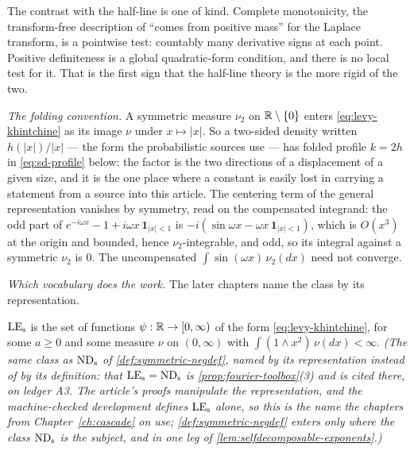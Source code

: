 \begin{remark}
The contrast with the half-line is one of kind. Complete monotonicity, the transform-free
description of ``comes from positive mass'' for the Laplace transform, is a pointwise test:
countably many derivative signs at each point. Positive definiteness is a global quadratic-form
condition, and there is no local test for it. That is the first sign that the half-line theory
is the more rigid of the two.
\end{remark}

\emph{The folding convention.} A symmetric \Levy{} measure $\nu_2$ on $\mathbb{R} \setminus \{0\}$
enters \ref{eq:levy-khintchine} as its image $\nu$ under $x \mapsto |x|$. So a two-sided
\Levy{} density written $h(|x|)/|x|$ --- the form the probabilistic sources use --- has folded
profile $k = 2h$ in \ref{eq:sd-profile} below: the factor is the two directions of a
displacement of a given size, and it is the one place where a constant is easily lost in
carrying a statement from a source into this article. The centering term of the general
representation vanishes by symmetry, read on the compensated integrand: the odd part of
$e^{-i\omega x} - 1 + i\omega x\,\mathbf 1_{|x| < 1}$ is
$-i(\sin\omega x - \omega x\,\mathbf 1_{|x|<1})$, which is $O(x^3)$ at the origin and bounded,
hence $\nu_2$-integrable, and odd, so its integral against a symmetric $\nu_2$ is $0$. The
uncompensated $\int \sin(\omega x)\,\nu_2(dx)$ need not converge.

\emph{Which vocabulary does the work.} The later chapters name the class by its representation.

\begin{definition}\label{def:levy-exponents}
\leanok
$\mathrm{LE}_{\mathrm{s}}$ is the set of functions $\psi : \mathbb{R} \to [0,\infty)$ of the form
\ref{eq:levy-khintchine}, for some $a \ge 0$ and some measure $\nu$ on $(0,\infty)$ with
$\int (1 \wedge x^2)\,\nu(dx) < \infty$.
\statusT\quad\emph{(The same class as $\mathrm{ND}_{\mathrm{s}}$ of \ref{def:symmetric-negdef}, named by its
representation instead of by its definition: that $\mathrm{LE}_{\mathrm{s}} = \mathrm{ND}_{\mathrm{s}}$ is \ref{prop:fourier-toolbox}(3)
and is cited there, on ledger A3. The article's proofs manipulate the representation, and the
machine-checked development defines $\mathrm{LE}_{\mathrm{s}}$ alone, so this is the name the chapters from
Chapter~\ref{ch:cascade} on use; \ref{def:symmetric-negdef} enters only where the class $\mathrm{ND}_{\mathrm{s}}$
is the subject, and in one leg of \ref{lem:selfdecomposable-exponents}.)}
\end{definition}

